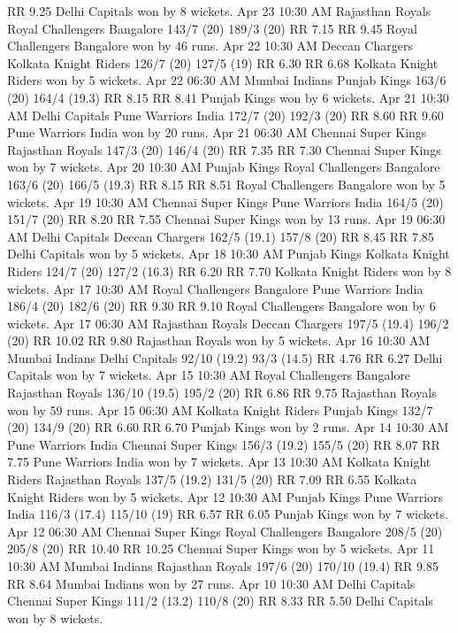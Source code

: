 RR 9.25
Delhi Capitals won by 8 wickets.
Apr 23
10:30 AM
Rajasthan Royals
Royal Challengers Bangalore
143/7 (20)
189/3 (20)
RR 7.15
RR 9.45
Royal Challengers Bangalore won by 46 runs.
Apr 22
10:30 AM
Deccan Chargers
Kolkata Knight Riders
126/7 (20)
127/5 (19)
RR 6.30
RR 6.68
Kolkata Knight Riders won by 5 wickets.
Apr 22
06:30 AM
Mumbai Indians
Punjab Kings
163/6 (20)
164/4 (19.3)
RR 8.15
RR 8.41
Punjab Kings won by 6 wickets.
Apr 21
10:30 AM
Delhi Capitals
Pune Warriors India
172/7 (20)
192/3 (20)
RR 8.60
RR 9.60
Pune Warriors India won by 20 runs.
Apr 21
06:30 AM
Chennai Super Kings
Rajasthan Royals
147/3 (20)
146/4 (20)
RR 7.35
RR 7.30
Chennai Super Kings won by 7 wickets.
Apr 20
10:30 AM
Punjab Kings
Royal Challengers Bangalore
163/6 (20)
166/5 (19.3)
RR 8.15
RR 8.51
Royal Challengers Bangalore won by 5 wickets.
Apr 19
10:30 AM
Chennai Super Kings
Pune Warriors India
164/5 (20)
151/7 (20)
RR 8.20
RR 7.55
Chennai Super Kings won by 13 runs.
Apr 19
06:30 AM
Delhi Capitals
Deccan Chargers
162/5 (19.1)
157/8 (20)
RR 8.45
RR 7.85
Delhi Capitals won by 5 wickets.
Apr 18
10:30 AM
Punjab Kings
Kolkata Knight Riders
124/7 (20)
127/2 (16.3)
RR 6.20
RR 7.70
Kolkata Knight Riders won by 8 wickets.
Apr 17
10:30 AM
Royal Challengers Bangalore
Pune Warriors India
186/4 (20)
182/6 (20)
RR 9.30
RR 9.10
Royal Challengers Bangalore won by 6 wickets.
Apr 17
06:30 AM
Rajasthan Royals
Deccan Chargers
197/5 (19.4)
196/2 (20)
RR 10.02
RR 9.80
Rajasthan Royals won by 5 wickets.
Apr 16
10:30 AM
Mumbai Indians
Delhi Capitals
92/10 (19.2)
93/3 (14.5)
RR 4.76
RR 6.27
Delhi Capitals won by 7 wickets.
Apr 15
10:30 AM
Royal Challengers Bangalore
Rajasthan Royals
136/10 (19.5)
195/2 (20)
RR 6.86
RR 9.75
Rajasthan Royals won by 59 runs.
Apr 15
06:30 AM
Kolkata Knight Riders
Punjab Kings
132/7 (20)
134/9 (20)
RR 6.60
RR 6.70
Punjab Kings won by 2 runs.
Apr 14
10:30 AM
Pune Warriors India
Chennai Super Kings
156/3 (19.2)
155/5 (20)
RR 8.07
RR 7.75
Pune Warriors India won by 7 wickets.
Apr 13
10:30 AM
Kolkata Knight Riders
Rajasthan Royals
137/5 (19.2)
131/5 (20)
RR 7.09
RR 6.55
Kolkata Knight Riders won by 5 wickets.
Apr 12
10:30 AM
Punjab Kings
Pune Warriors India
116/3 (17.4)
115/10 (19)
RR 6.57
RR 6.05
Punjab Kings won by 7 wickets.
Apr 12
06:30 AM
Chennai Super Kings
Royal Challengers Bangalore
208/5 (20)
205/8 (20)
RR 10.40
RR 10.25
Chennai Super Kings won by 5 wickets.
Apr 11
10:30 AM
Mumbai Indians
Rajasthan Royals
197/6 (20)
170/10 (19.4)
RR 9.85
RR 8.64
Mumbai Indians won by 27 runs.
Apr 10
10:30 AM
Delhi Capitals
Chennai Super Kings
111/2 (13.2)
110/8 (20)
RR 8.33
RR 5.50
Delhi Capitals won by 8 wickets.
